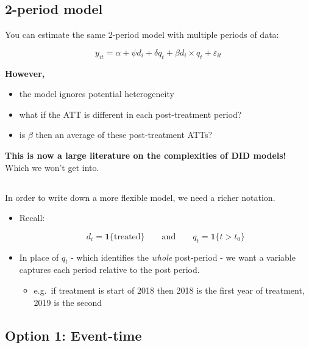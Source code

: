 \documentclass[
  letterpaper,
  DIV=11,
  numbers=noendperiod]{scrartcl}
\providecommand{\tightlist}{%
  \setlength{\itemsep}{0pt}\setlength{\parskip}{0pt}}
\begin{document}
\subsection{2-period model}\label{period-model}

You can estimate the same 2-period model with multiple periods of data:

\[
  y_{it} = \alpha + \psi d_i + \delta q_t + \beta d_i\times q_t + \varepsilon_{it}
\]

\textbf{However,}

\begin{itemize}
\item
  the model ignores potential heterogeneity
\item
  what if the ATT is different in each post-treatment period?
\item
  is \(\beta\) then an average of these post-treatment ATTs?
\end{itemize}

\textbf{This is now a large literature on the complexities of DID
models!} Which we won't get into.

\subsection{}\label{section-11}

In order to write down a more flexible model, we need a richer notation.

\begin{itemize}
\item
  Recall:

  \[
    d_i = \mathbf{1}\{\text{treated}\}\qquad \text{and}\qquad q_t = \mathbf{1}\{t>t_0\}
  \]
\item
  In place of \(q_t\) - which identifies the \emph{whole} post-period -
  we want a variable captures each period relative to the post period.

  \begin{itemize}
  \tightlist
  \item
    e.g.~if treatment is start of 2018 then 2018 is the first year of
    treatment, 2019 is the second
  \end{itemize}
\end{itemize}

\subsection{Option 1: Event-time}\label{option-1-event-time}
\end{document}
